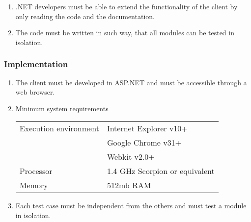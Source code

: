 \begin{enumerate}[label=\textbf{NFR-\twodigits*}, resume]
\item .NET developers must be able to extend the functionality of the client by only reading the code and the documentation.
\item The code must be written in such way, that all modules can be tested in isolation.
\end{enumerate}

\subsubsection{Implementation}
\begin{enumerate}[label=\textbf{NFR-\twodigits*}, resume]
\item The client must be developed in ASP.NET and must be accessible through a web browser.
\item Minimum system requirements


\begin{tabular}{| l | l | }
\hline
 Execution environment & Internet Explorer v10+\\
& Google Chrome v31+\\
& Webkit v2.0+\\ \hline
 Processor & 1.4 GHz Scorpion or equivalent \\ \hline
 Memory & 512mb RAM  \\ \hline

\end{tabular}

\item Each test case must be independent from the others and must test a module in isolation.
\end{enumerate}



%
